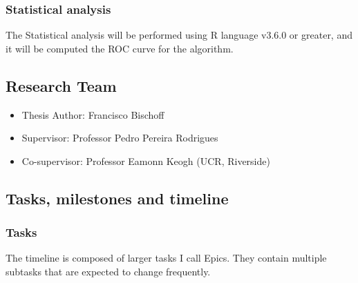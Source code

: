 \documentclass[runningheads]{llncs}
\providecommand{\tightlist}{%
  \setlength{\itemsep}{0pt}\setlength{\parskip}{0pt}}
\begin{document}
\hypertarget{statistical-analysis}{%
\subsubsection{Statistical analysis}\label{statistical-analysis}}

The Statistical analysis will be performed using R language v3.6.0 or
greater, and it will be computed the ROC curve for the algorithm.

\hypertarget{research-team}{%
\subsection{Research Team}\label{research-team}}

\begin{itemize}
\tightlist
\item
  Thesis Author: Francisco Bischoff
\item
  Supervisor: Professor Pedro Pereira Rodrigues
\item
  Co-supervisor: Professor Eamonn Keogh (UCR, Riverside)
\end{itemize}

\hypertarget{tasks-milestones-and-timeline}{%
\subsection{Tasks, milestones and
timeline}\label{tasks-milestones-and-timeline}}

\hypertarget{tasks}{%
\subsubsection{Tasks}\label{tasks}}

The timeline is composed of larger tasks I call Epics. They contain
multiple subtasks that are expected to change frequently.
\end{document}
